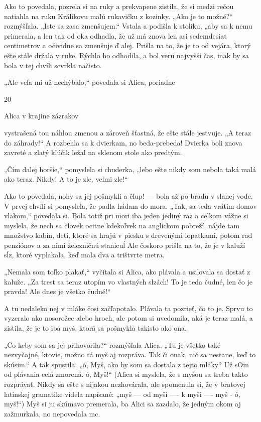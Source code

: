 \documentclass[12pt]{book}
\begin{document}
\begin{Parallel}[p]{}{}
{Ako to povedala, pozrela si na ruky a prekvapene zistila,
že si medzi rečou natiahla na ruku Králikovu malú rukavičku
z kozinky. „Ako je to možné?“ rozmýšľala. „Iste sa zasa
zmenšujem.“ Vstala a podišla k stolíku, „aby sa k nemu
primerala, a len tak od oka odhadla, že už má znova len asi
sedemdesiat centimetrov a očividne sa zmenšuje ď alej.
Prišla na to, že je to od vejára, ktorý ešte stále držala v ruke.
Rýchlo ho odhodila, a bol veru najvyšší čas, inak by sa bola
v tej chvíli scvrkla načisto.

„Ale veľa mi už nechýbalo,“ povedala si Alica, poriadne

20

Alica v krajine zázrakov

vystrašená tou náhlou zmenou a zároveň šťastná, že ešte
stále jestvuje. „A teraz do záhrady!“ A rozbehla sa
k dvierkam, no beda-prebeda! Dvierka boli znova zavreté
a zlatý kľúčik ležal na sklenom stole ako predtým.

„Čím dalej horšie,“ pomyslela si chuderka, „lebo ešte
nikdy som nebola taká malá ako teraz. Nikdy! A to je zle,
veľmi zle!“

Ako to povedala, nohy sa jej pošmykli a čľup! — bola až
po bradu v slanej vode. V prvej chvíli si pomyslela, že padla
hádam do mora. „Tak, sa teda vrátim domov vlakom,“
povedala si. Bola totiž pri mori iba jeden jediný raz a celkom
vážne si myslela, že nech sa človek ocitne kdekoľvek na
anglickom pobreží, nájde tam množstvo kabín, deti, ktoré sa
hrajú v piesku s drevenými lopatkami, potom rad penziónov
a za nimi železničnú stanicuĺ Ale čoskoro prišla na to, že je
v kaluží sĺz, ktoré vyplakala, keď mala dva a trištvrte
metra.

„Nemala som toľko plakať,“ vyčítala si Alica, ako plávala
a usilovala sa dostať z kaluže. „Za trest sa teraz utopím vo
vlastných slzách! To je teda čudné, len čo je pravda! Ale
dnes je všetko čudné!“

A tu nedaleko nej v mláke čosi začľapotalo. Plávala ta
pozrieť, čo to je. Sprvu to vyzeralo ako nosorožec alebo
hroch, ale potom si uvedomila, aká je teraz malá, a zistila,
že je to iba myš, ktorá sa pošmykla takisto ako ona.

„Čo keby som sa jej prihovorila?“ rozmýšľala Alica. „Tu
je všetko také nezvyčajné, ktovie, možno tá myš aj rozpráva.
Tak či onak, nič sa nestane, keď to skúsim.“ A tak spustila:
„ó, Myš, ako by som sa dostala z tejto mláky? Už sOm od
plávania celá zmorená. ó, Myš!“ (Alica si myslela, že
s myšou sa treba takto rozprávať. Nikdy sa ešte s nijakou
nezhovárala, ale spomenula si, že v bratovej latinskej
gramatike videla napísané: „myš — od myši —- k myši —- myš
- ó, myš!“) Myš si ju skúmavo premerala, ba Alici sa
zazdalo, že jedným okom aj zažmurkala, no nepovedala
mc.

}
\end{Parallel}
\end{document}
